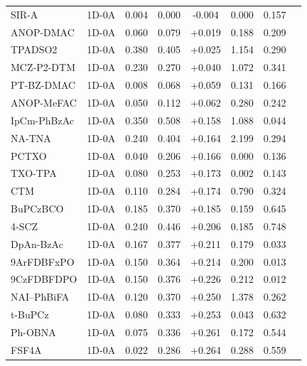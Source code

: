 \begin{longtable}{llcccccc}
SIR-A & 1D-0A & 0.004 & 0.000 & -0.004 & 0.000 & 0.157 & \cite{doi101016jcej2022135222} \\
ANOP-DMAC & 1D-0A & 0.060 & 0.079 & +0.019 & 0.188 & 0.209 & \cite{doi101039D2TC02089K} \\
TPADSO2 & 1D-0A & 0.380 & 0.405 & +0.025 & 1.154 & 0.290 & \cite{doi101016jdyepig201612037} \\
MCZ-P2-DTM & 1D-0A & 0.230 & 0.270 & +0.040 & 1.072 & 0.341 & \cite{doi101016jdyepig201903016} \\
PT-BZ-DMAC & 1D-0A & 0.008 & 0.068 & +0.059 & 0.131 & 0.166 & \cite{doi101016jdyepig2021109649} \\
ANOP-MeFAC & 1D-0A & 0.050 & 0.112 & +0.062 & 0.280 & 0.242 & \cite{doi101039D2TC02089K} \\
IpCm-PhBzAc & 1D-0A & 0.350 & 0.508 & +0.158 & 1.088 & 0.044 & \cite{doi101039C8TC02739K} \\
NA-TNA & 1D-0A & 0.240 & 0.404 & +0.164 & 2.199 & 0.294 & \cite{doi101039C5TC00779H} \\
PCTXO & 1D-0A & 0.040 & 0.206 & +0.166 & 0.000 & 0.136 & \cite{doi101039D1RA04599G} \\
TXO-TPA & 1D-0A & 0.080 & 0.253 & +0.173 & 0.002 & 0.143 & \cite{doi101039D1RA04599G} \\
CTM & 1D-0A & 0.110 & 0.284 & +0.174 & 0.790 & 0.324 & \cite{doi101039D0TC01733G} \\
BuPCzBCO & 1D-0A & 0.185 & 0.370 & +0.185 & 0.159 & 0.645 & \cite{doi101016jdyepig2022110937} \\
4-SCZ & 1D-0A & 0.240 & 0.446 & +0.206 & 0.185 & 0.748 & \cite{doi101016jjlumin201810017} \\
DpAn-BzAc & 1D-0A & 0.167 & 0.377 & +0.211 & 0.179 & 0.033 & \cite{doi101039D2NJ02881F} \\
9ArFDBFxPO & 1D-0A & 0.150 & 0.364 & +0.214 & 0.200 & 0.013 & \cite{doi101016jcej2019122485} \\
9CzFDBFDPO & 1D-0A & 0.150 & 0.376 & +0.226 & 0.212 & 0.012 & \cite{doi101016jcej2019122485} \\
NAI--PhBiFA & 1D-0A & 0.120 & 0.370 & +0.250 & 1.378 & 0.262 & \cite{doi101039C8TC06163G} \\
t-BuPCz & 1D-0A & 0.080 & 0.333 & +0.253 & 0.043 & 0.632 & \cite{doi101039C9CC06804J} \\
Ph-OBNA & 1D-0A & 0.075 & 0.336 & +0.261 & 0.172 & 0.544 & \cite{doi101039D1TC04712D} \\
FSF4A & 1D-0A & 0.022 & 0.286 & +0.264 & 0.288 & 0.559 & \cite{doi101039D0MA01005G} \\

\end{longtable}
